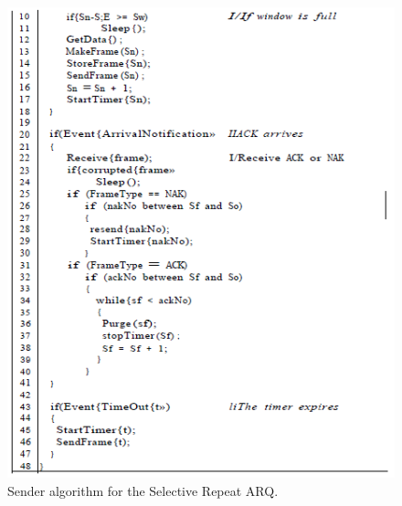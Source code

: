 \begin{figure}[H]
\begin{center}
\includegraphics[scale=1]{senderselective2.PNG} 
\caption{Sender algorithm for the Selective Repeat ARQ.}
\end{center}
\end{figure}

